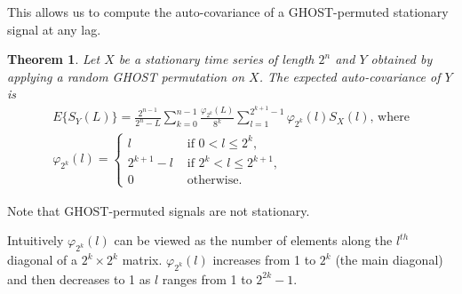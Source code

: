 \documentclass[12pt]{article}
\newtheorem{basictheorem}{Theorem}
\begin{document}
  This allows us to compute the auto-covariance of a GHOST-permuted
  stationary signal at any lag.

  \begin{basictheorem}\label{acf}
    Let $X$ be a stationary time series of length $2^n$ and $Y$ obtained
    by applying a random GHOST permutation on $X$.
    The expected auto-covariance of $Y$ is
      \begin{eqnarray}
        E\{S_Y(L)\} = 
        \frac{2^{n-1}}{2^n-L}\sum_{k=0}^{n-1} \frac{\varphi_{2^k}(L)}{8^k}
          \sum_{l=1}^{2^{k+1}-1} \varphi_{2^k}(l) S_X(l)
          \label{acfL} \text{, where} \\
        \varphi_{2^k}(l) = \left\{
          \begin{array}{cc}
            l & \text{ if } 0 < l \leq 2^k, \\
            2^{k+1}-l & \text{ if } 2^k < l \leq 2^{k+1}, \\
            0 & \text{ otherwise.}
          \end{array}
          \right. \label{phi}
      \end{eqnarray}
       
  \end{basictheorem}

  Note that GHOST-permuted signals are not stationary.

  Intuitively $\varphi_{2^k}(l)$ can be viewed as the number of elements
  along the $l^{th}$ diagonal of a $2^k \times 2^k$ matrix.
  $\varphi_{2^k}(l)$ increases from 1 to $2^k$ (the main diagonal) and
  then decreases to 1 as $l$ ranges from 1 to $2^{2k}-1$.
\end{document}
